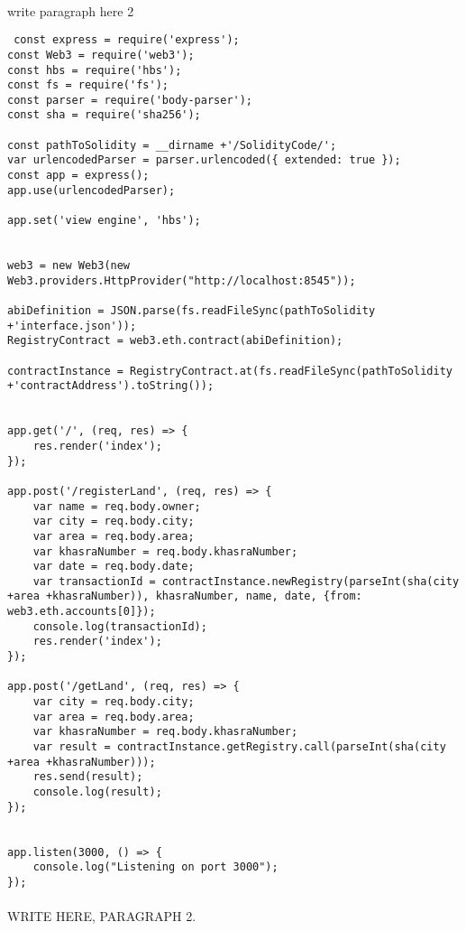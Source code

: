 \paragraph{} write paragraph here 2
\begin{lstlisting}
 const express = require('express');
const Web3 = require('web3');
const hbs = require('hbs');
const fs = require('fs');
const parser = require('body-parser');
const sha = require('sha256');

const pathToSolidity = __dirname +'/SolidityCode/';
var urlencodedParser = parser.urlencoded({ extended: true });
const app = express();
app.use(urlencodedParser);

app.set('view engine', 'hbs');


web3 = new Web3(new Web3.providers.HttpProvider("http://localhost:8545"));

abiDefinition = JSON.parse(fs.readFileSync(pathToSolidity +'interface.json'));
RegistryContract = web3.eth.contract(abiDefinition);

contractInstance = RegistryContract.at(fs.readFileSync(pathToSolidity +'contractAddress').toString());


app.get('/', (req, res) => {
	res.render('index');
});

app.post('/registerLand', (req, res) => {
	var name = req.body.owner;
	var city = req.body.city;
	var area = req.body.area;
	var khasraNumber = req.body.khasraNumber;
	var date = req.body.date;
	var transactionId = contractInstance.newRegistry(parseInt(sha(city +area +khasraNumber)), khasraNumber, name, date, {from: web3.eth.accounts[0]});
	console.log(transactionId);
	res.render('index');
});

app.post('/getLand', (req, res) => {
	var city = req.body.city;
	var area = req.body.area;
	var khasraNumber = req.body.khasraNumber;
	var result = contractInstance.getRegistry.call(parseInt(sha(city +area +khasraNumber)));
	res.send(result);
	console.log(result);
});


app.listen(3000, () => {
	console.log("Listening on port 3000");
});
\end{lstlisting}
\paragraph{}WRITE HERE, PARAGRAPH 2.

